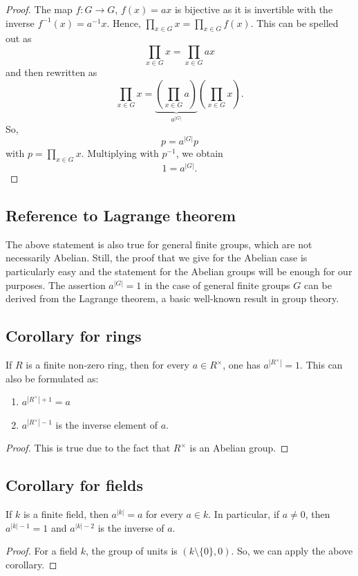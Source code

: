 \documentclass[11pt,a4paper]{amsart}
\begin{document}
\begin{proof} 
	The map $f : G \to G$, $f(x) = a x$ is bijective as it is invertible with the inverse $f^{-1}(x) = a^{-1} x$. Hence, $\prod_{x \in G} x = \prod_{x \in G} f(x)$. This can be spelled out as 
	\[
		\prod_{x \in G} x = \prod_{x \in G} a x
	\]
	and then rewritten as 
	\[
		\prod_{x \in G} x = \underbrace{ \left( \prod_{x \in G} a \right)}_{a^{|G|}} \left( \prod_{x \in G}  x \right). 
	\]
	So, 
	\[
		p = a^{|G|} p
	\]
	with $p = \prod_{x \in G} x$. Multiplying with $p^{-1}$, we obtain 
	\[
		1 = a^{|G|}. 
	\]
\end{proof} 

\subsection{Reference to Lagrange theorem} The above statement is also true for general finite groups, which are not necessarily Abelian. Still, the proof that we give for the Abelian case is particularly easy and the statement for the Abelian groups will be enough for our purposes. The assertion $a^{|G|} = 1$ in the case of general finite groups $G$ can be derived from the Lagrange theorem, a basic well-known result in group theory. 

\subsection{Corollary for rings} If $R$ is a finite non-zero ring, then for every $a \in R^\times$, one has $a^{|R^\times|} =1$. This can also be formulated as: 
\begin{enumerate} 
\item $a^{|R^\times| + 1} = a$
\item $a^{|R^\times|-1}$ is the inverse element of $a$. 
\end{enumerate} 

\begin{proof} 
	This is true due to the fact that $R^\times$ is an Abelian group. 
\end{proof} 

\subsection{Corollary for fields} If $k$ is a finite field, then $a^{|k|} = a$ for every $a \in k$. In particular, if $a \ne 0$, then  $a^{|k|-1} = 1$ and $a^{|k|-2}$ is the inverse of $a$. 

\begin{proof} 
	For a field $k$, the group of units is $(k \setminus \{0\}, 0)$. So, we can apply the above corollary. 
\end{proof} 
\end{document}
